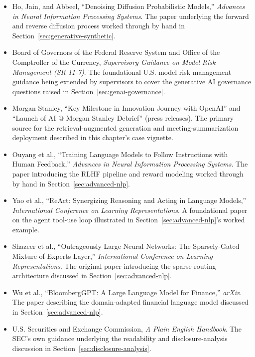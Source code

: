 \documentclass[../ai_in_finance]{subfiles}
\begin{document}
\begin{itemize}
    \item Ho, Jain, and Abbeel, ``Denoising Diffusion Probabilistic Models,'' \emph{Advances in Neural Information Processing Systems}. The paper underlying the forward and reverse diffusion process worked through by hand in Section~\ref{sec:generative-synthetic}.
    \item Board of Governors of the Federal Reserve System and Office of the Comptroller of the Currency, \emph{Supervisory Guidance on Model Risk Management (SR 11-7)}. The foundational U.S. model risk management guidance being extended by supervisors to cover the generative AI governance questions raised in Section~\ref{sec:genai-governance}.
    \item Morgan Stanley, ``Key Milestone in Innovation Journey with OpenAI'' and ``Launch of AI @ Morgan Stanley Debrief'' (press releases). The primary source for the retrieval-augmented generation and meeting-summarization deployment described in this chapter's case vignette.
    \item Ouyang et al., ``Training Language Models to Follow Instructions with Human Feedback,'' \emph{Advances in Neural Information Processing Systems}. The paper introducing the RLHF pipeline and reward modeling worked through by hand in Section~\ref{sec:advanced-nlp}.
    \item Yao et al., ``ReAct: Synergizing Reasoning and Acting in Language Models,'' \emph{International Conference on Learning Representations}. A foundational paper on the agent tool-use loop illustrated in Section~\ref{sec:advanced-nlp}'s worked example.
    \item Shazeer et al., ``Outrageously Large Neural Networks: The Sparsely-Gated Mixture-of-Experts Layer,'' \emph{International Conference on Learning Representations}. The original paper introducing the sparse routing architecture discussed in Section~\ref{sec:advanced-nlp}.
    \item Wu et al., ``BloombergGPT: A Large Language Model for Finance,'' \emph{arXiv}. The paper describing the domain-adapted financial language model discussed in Section~\ref{sec:advanced-nlp}.
    \item U.S. Securities and Exchange Commission, \emph{A Plain English Handbook}. The SEC's own guidance underlying the readability and disclosure-analysis discussion in Section~\ref{sec:disclosure-analysis}.
\end{itemize}
\end{document}
